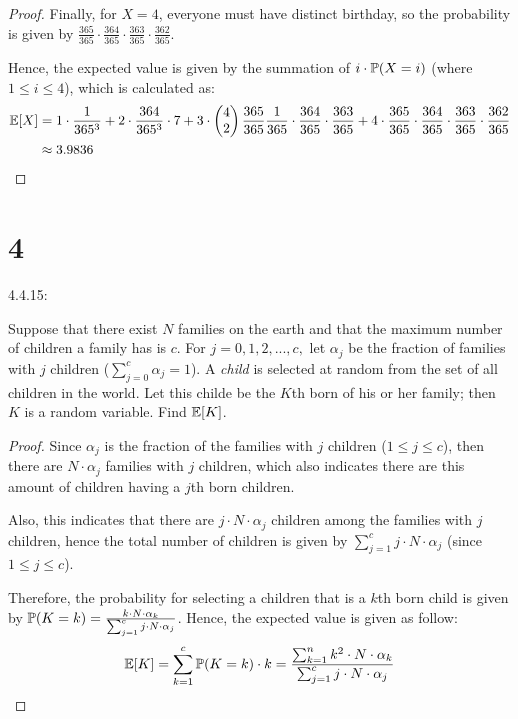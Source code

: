 \documentclass{article}
\begin{document}
\begin{proof}
    Finally, for $X=4$, everyone must have distinct birthday, so the probability is given by $\frac{365}{365}\cdot\frac{364}{365}\cdot \frac{363}{365}\cdot\frac{362}{365}$.

    Hence, the expected value is given by the summation of $i\cdot \mathbb{P}(X=i)$ (where $1\leq i\leq 4$), which is calculated as:
    \begin{align}
        \mathbb{E}[X] &= 1\cdot\frac{1}{365^3}+2\cdot\frac{364}{365^3}\cdot 7+3\cdot\begin{pmatrix}4\\2\end{pmatrix}\frac{365}{365}\frac{1}{365}\cdot \frac{364}{365}\cdot\frac{363}{365} + 4\cdot\frac{365}{365}\cdot\frac{364}{365}\cdot \frac{363}{365}\cdot\frac{362}{365}\\
        &\approx 3.9836
    \end{align}
\end{proof}

\newpage

\section*{4}
\begin{ques}\label{q4}
    4.4.15:

    Suppose that there exist $N$ families on the earth and that the maximum number of children a family has is $c$. For $j=0,1,2,...,c,$ let $\alpha_j$ be the fraction of families with $j$ children ($\sum_{j=0}^c \alpha_j=1$). A \emph{child} is selected at random from the set of all children in the world. Let this childe be the $K$th born of his or her family; then $K$ is a random variable. Find $\mathbb{E}[K]$.
\end{ques}
\begin{proof}
    Since $\alpha_j$ is the fraction of the families with $j$ children ($1\leq j\leq c$), then there are $N\cdot \alpha_j$ families with $j$ children, which also indicates there are this amount of children having a $j$th born children. 

    Also, this indicates that there are $j\cdot N\cdot \alpha_j$ children among the families with $j$ children, hence the total number of children is given by $\sum_{j=1}^{c}j\cdot N\cdot \alpha_j$ (since $1\leq j\leq c$).

    Therefore, the probability for selecting a children that is a $k$th born child is given by $\mathbb{P}(K=k) = \frac{k\cdot N\cdot \alpha_k}{\sum_{j=1}^{c}j\cdot N\cdot \alpha_j}$. Hence, the expected value is given as follow:
    \begin{align}
        \mathbb{E}[K]=\sum_{k=1}^{c}\mathbb{P}(K=k)\cdot k = \frac{\sum_{k=1}^{n}k^2\cdot N\cdot \alpha_k}{\sum_{j=1}^{c}j\cdot N\cdot \alpha_j}
    \end{align}
\end{proof}
\end{document}
